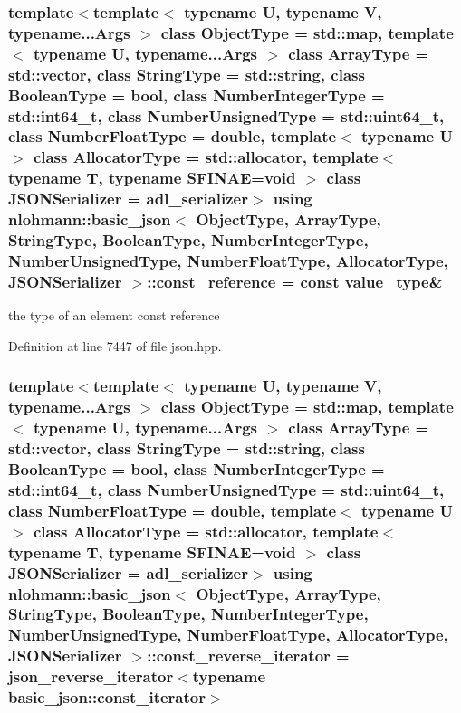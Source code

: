 \subsubsection[{\texorpdfstring{const\+\_\+reference}{const_reference}}]{\setlength{\rightskip}{0pt plus 5cm}template$<$template$<$ typename U, typename V, typename...\+Args $>$ class Object\+Type = std\+::map, template$<$ typename U, typename...\+Args $>$ class Array\+Type = std\+::vector, class String\+Type  = std\+::string, class Boolean\+Type  = bool, class Number\+Integer\+Type  = std\+::int64\+\_\+t, class Number\+Unsigned\+Type  = std\+::uint64\+\_\+t, class Number\+Float\+Type  = double, template$<$ typename U $>$ class Allocator\+Type = std\+::allocator, template$<$ typename T, typename S\+F\+I\+N\+A\+E=void $>$ class J\+S\+O\+N\+Serializer = adl\+\_\+serializer$>$ using {\bf nlohmann\+::basic\+\_\+json}$<$ Object\+Type, Array\+Type, String\+Type, Boolean\+Type, Number\+Integer\+Type, Number\+Unsigned\+Type, Number\+Float\+Type, Allocator\+Type, J\+S\+O\+N\+Serializer $>$\+::{\bf const\+\_\+reference} =  const {\bf value\+\_\+type}\&}\hypertarget{classnlohmann_1_1basic__json_a4057c5425f4faacfe39a8046871786ca}{}\label{classnlohmann_1_1basic__json_a4057c5425f4faacfe39a8046871786ca}


the type of an element const reference 



Definition at line 7447 of file json.\+hpp.

\subsubsection[{\texorpdfstring{const\+\_\+reverse\+\_\+iterator}{const_reverse_iterator}}]{\setlength{\rightskip}{0pt plus 5cm}template$<$template$<$ typename U, typename V, typename...\+Args $>$ class Object\+Type = std\+::map, template$<$ typename U, typename...\+Args $>$ class Array\+Type = std\+::vector, class String\+Type  = std\+::string, class Boolean\+Type  = bool, class Number\+Integer\+Type  = std\+::int64\+\_\+t, class Number\+Unsigned\+Type  = std\+::uint64\+\_\+t, class Number\+Float\+Type  = double, template$<$ typename U $>$ class Allocator\+Type = std\+::allocator, template$<$ typename T, typename S\+F\+I\+N\+A\+E=void $>$ class J\+S\+O\+N\+Serializer = adl\+\_\+serializer$>$ using {\bf nlohmann\+::basic\+\_\+json}$<$ Object\+Type, Array\+Type, String\+Type, Boolean\+Type, Number\+Integer\+Type, Number\+Unsigned\+Type, Number\+Float\+Type, Allocator\+Type, J\+S\+O\+N\+Serializer $>$\+::{\bf const\+\_\+reverse\+\_\+iterator} =  {\bf json\+\_\+reverse\+\_\+iterator}$<$typename {\bf basic\+\_\+json\+::const\+\_\+iterator}$>$}\hypertarget{classnlohmann_1_1basic__json_a72be3c24bfa24f0993d6c11af03e7404}{}\label{classnlohmann_1_1basic__json_a72be3c24bfa24f0993d6c11af03e7404}


